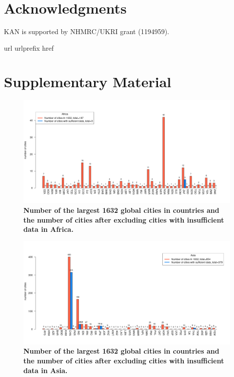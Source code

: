 \documentclass[preprint,12pt]{elsarticle}
\newcommand{\beginsupplement}{%
        \setcounter{table}{0}
        \renewcommand{\thetable}{S\arabic{table}}%
        \setcounter{figure}{0}
        \renewcommand{\thefigure}{S\arabic{figure}}%
     }
\begin{document}
\section*{Acknowledgments}\label{sec:ak}
KAN is supported by NHMRC/UKRI grant (1194959).






 
%
\begin{thebibliography}{1}
\expandafter\ifx\csname url\endcsname\relax
  \def\url#1{\texttt{#1}}\fi
\expandafter\ifx\csname urlprefix\endcsname\relax\def\urlprefix{URL }\fi
\expandafter\ifx\csname href\endcsname\relax
  \def\href#1#2{#2} \def\path#1{#1}\fi

\end{thebibliography}


\section{Supplementary Material}
\beginsupplement

\begin{figure}
\centering
\includegraphics[trim={ 0 35 25 50 },clip,scale=0.45]{Images/Africa_cities.png}
\caption{\bf Number of the largest 1632 global cities in countries and the number of cities after excluding cities with insufficient data in Africa.}
 \label{fig:africa}
\end{figure}

\begin{figure}
\centering
\includegraphics[trim={ 0 35 25 50 },clip,scale=0.45]{Images/Asia_cities.png}
\caption{\bf Number of the largest 1632 global cities in countries and the number of cities after excluding cities with insufficient data in Asia.}
 \label{fig:asia}
\end{figure}
\end{document}
